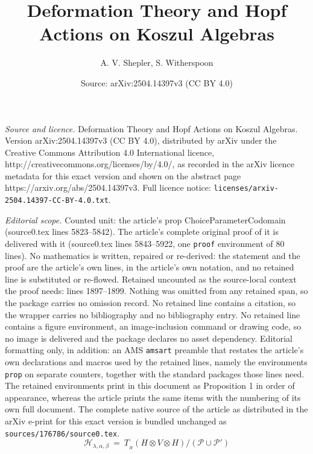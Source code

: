\documentclass[10pt,a4paper]{amsart}
\title{Deformation Theory and Hopf Actions on Koszul Algebras}
\author{A. V. Shepler, S. Witherspoon}
\date{Source: arXiv:2504.14397v3 (CC BY 4.0)}
\newcommand{\Ho}{H}%
\renewcommand{\P}{\mathcal{P}}
\newcommand{\cH}{\mathcal{H}}
\newcommand{\chabl}{\cH_{\lambda,\alpha,\beta}}
\newcommand{\ot}{\otimes}
\begin{document}
\maketitle

\noindent\emph{Source and licence.} Deformation Theory and Hopf Actions on Koszul Algebras. Version arXiv:2504.14397v3 (CC BY 4.0), distributed by arXiv under the Creative Commons Attribution 4.0 International licence, http://creativecommons.org/licenses/by/4.0/, as recorded in the arXiv licence metadata for this exact version and shown on the abstract page https://arxiv.org/abs/2504.14397v3. Full licence notice: \texttt{licenses/arxiv-2504.14397-CC-BY-4.0.txt}.\par\smallskip

\noindent\textit{Editorial scope.} Counted unit: the article's prop ChoiceParameterCodomain (source0.tex lines 5823--5842). The article's complete original proof of it is delivered with it (source0.tex lines 5843--5922, one \texttt{proof} environment of 80 lines). No mathematics is written, repaired or re-derived: the statement and the proof are the article's own lines, in the article's own notation, and no retained line is substituted or re-flowed.  Retained uncounted as the source-local context the proof needs: lines 1897--1899.  Nothing was omitted from any retained span, so the package carries no omission record.  No retained line contains a citation, so the wrapper carries no bibliography and no bibliography entry.  No retained line contains a figure environment, an image-inclusion command or drawing code, so no image is delivered and the package declares no asset dependency.  Editorial formatting only, in addition: an AMS \texttt{amsart} preamble that restates the article's own declarations and macros used by the retained lines, namely the environments \texttt{prop} on separate counters, together with the standard packages those lines need.  The retained environments print in this document as Proposition 1 in order of appearance, whereas the article prints the same items with the numbering of its own full document.  The complete native source of the article as distributed in the arXiv e-print for this exact version is bundled unchanged as \texttt{sources/176786/source0.tex}.
\begin{equation}\label{eqn:Hlab}
   \chabl \ =\ T_{\! _H}(\Ho\ot V \ot \Ho)/ (\P\cup \P')
\end{equation}
\end{document}
